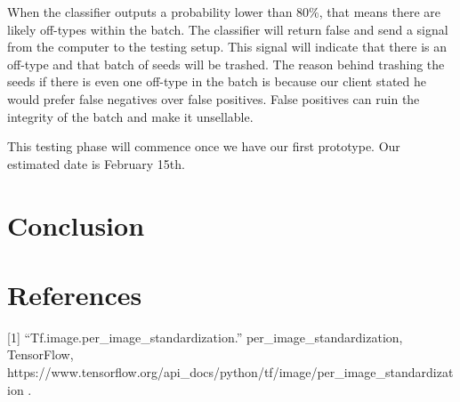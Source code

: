 \documentclass[onecolumn, draftclsnofoot,10pt, compsoc]{IEEEtran}
\begin{document}
When the classifier outputs a probability lower than 80\%, that means there are likely off-types within the batch. The classifier will return false and send a signal from the computer to the testing setup. This signal will indicate that there is an off-type and that batch of seeds will be trashed. The reason behind trashing the seeds if there is even one off-type in the batch is because our client stated he would prefer false negatives over false positives. False positives can ruin the integrity of the batch and make it unsellable. 

This testing phase will commence once we have our first prototype. Our estimated date is February 15th. 

\section{Conclusion}
\section{References}

[1] “Tf.image.per\_image\_standardization.” per\_image\_standardization, TensorFlow, https://www.tensorflow.org/api\_docs/python/tf/image/per\_image\_standardization . 
\end{document}
